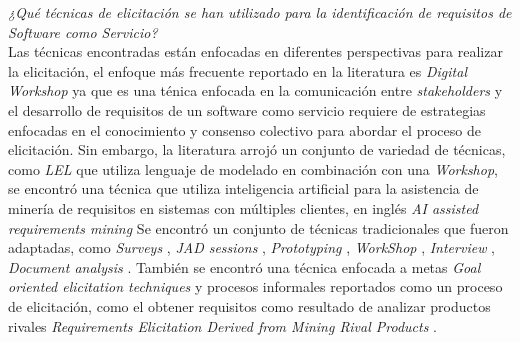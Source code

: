\documentclass[conference,onecolumn,10pt]{IEEEtran}
\begin{document}
\emph{¿Qué técnicas de elicitación se han utilizado para la identificación de requisitos de Software como Servicio?} \\
Las técnicas encontradas están enfocadas en diferentes perspectivas para realizar la elicitación, el enfoque más 
frecuente reportado en la literatura es \emph{Digital Workshop} \cite{EF-1,EF-4,EF-5,EF-8,EF-9,EF-13,EF-15} 
ya que es una ténica enfocada en la comunicación
entre \emph{stakeholders} y el desarrollo de requisitos de un software como servicio requiere de estrategias 
enfocadas en el conocimiento y consenso colectivo para abordar el proceso de elicitación. 
Sin embargo, la literatura arrojó un conjunto de variedad de técnicas, como \emph{LEL} \cite{EF-6} que utiliza lenguaje 
de modelado en combinación con una \emph{Workshop}, se encontró una técnica que utiliza inteligencia artificial 
para la asistencia de minería de requisitos en sistemas con múltiples clientes, en inglés \emph{AI assisted requirements mining} \cite{EF-5}
Se encontró un conjunto de técnicas tradicionales que fueron adaptadas, como \emph{Surveys} \cite{EF-2}, \emph{JAD sessions} \cite{EF-1}, \emph{Prototyping} \cite{EF-2},
\emph{WorkShop} \cite{EF-14, EF-6}, \emph{Interview} \cite{EF-11}, \emph{Document analysis} \cite{EF-15}.
También se encontró una técnica enfocada a metas \emph{Goal oriented elicitation techniques} \cite{EF-18} y procesos informales reportados como 
un proceso de elicitación, como el obtener requisitos como resultado de analizar productos rivales \emph{Requirements Elicitation Derived from Mining Rival Products} \cite{EF-19}.
\end{document}
